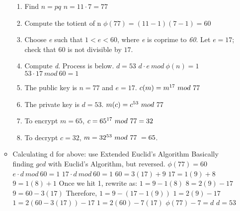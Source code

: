 \documentclass{article}
\begin{document}
\begin{itemize}
\begin{itemize}
\begin{enumerate}
          \item Find $ n = pq $
            \subitem $ n = 11 \cdot 7 = 77 $
          \item Compute the totient of n
            \subitem $ \phi(77) = (11 - 1)(7 - 1) = 60 $
          \item Choose \emph{e} such that $ 1 < e < 60 $, where \emph{e} is coprime to \emph{60}. 
            \subitem Let $ e = 17 $; check that $ 60 $ is not divisible by $ 17 $.
          \item Compute \emph{d}. Process is below.
            \subitem $ d = 53 $
            \subitem $ d \cdot e\ mod\ \phi(n) = 1 $
            \subitem $ 53 \cdot 17\ mod\ 60 = 1 $
          \item The public key is $ n = 77 $ and $ e = 17 $. 
            \subitem $ c(m) = m\textsuperscript{17}\ mod\ 77 $
          \item The private key is $ d = 53 $.
            \subitem $ m(c) = c\textsuperscript{53}\ mod\ 77 $
          \item To encrypt $ m = 65 $, 
            \subitem $ c = 65\textsuperscript{17}\ mod\ 77 = 32 $
          \item To decrypt $ c = 32 $, 
            \subitem $ m = 32\textsuperscript{53}\ mod\ 77\ = 65 $. 
        \end{enumerate}
      \item Calculating d for above: use Extended Euclid's Algorithm 
        \subitem Basically finding $ gcd $ with Euclid's Algorithm, but reversed.
    \subitem $ \phi(77) = 60 $
    \subitem $ e \cdot d\ mod\ 60 = 1 $
    \subitem $ 17 \cdot d\ mod\ 60 = 1 $
    \subitem $ 60 = 3(17) + 9 $
    \subitem $ 17 = 1(9) + 8 $
    \subitem $ 9 = 1(8) + 1 $
    \subitem Once we hit 1, rewrite as:
    \subitem $ 1 = 9 - 1(8) $
    \subitem $ 8 = 2(9) - 17 $
    \subitem $ 9 = 60 - 3(17) $
    \subitem Therefore,
    \subitem $ 1 = 9 - (17 - 1(9)) $
    \subitem $ 1 = 2(9) - 17 $
    \subitem $ 1 = 2(60 - 3(17)) - 17 $
    \subitem $ 1 = 2(60) - 7(17) $
    \subitem $ \phi(77) - 7 = d $
    \subitem $ d = 53 $
  \end{itemize}


\end{itemize}
\end{document}
